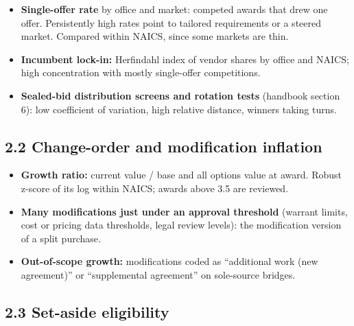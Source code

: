 \documentclass[letterpaper,11pt]{article}
\providecommand{\tightlist}{\setlength{\itemsep}{0pt}\setlength{\parskip}{0pt}}
\begin{document}
\begin{itemize}
\tightlist
\item
  \textbf{Single-offer rate} by office and market: competed awards that
  drew one offer. Persistently high rates point to tailored requirements
  or a steered market. Compared within NAICS, since some markets are
  thin.
\item
  \textbf{Incumbent lock-in:} Herfindahl index of vendor shares by
  office and NAICS; high concentration with mostly single-offer
  competitions.
\item
  \textbf{Sealed-bid distribution screens and rotation tests} (handbook
  section 6): low coefficient of variation, high relative distance,
  winners taking turns.
\end{itemize}

\hypertarget{change-order-and-modification-inflation}{%
\subsection*{2.2 Change-order and modification
inflation}\label{change-order-and-modification-inflation}}

\begin{itemize}
\tightlist
\item
  \textbf{Growth ratio:} current value / base and all options value at
  award. Robust z-score of its log within NAICS; awards above 3.5 are
  reviewed.
\item
  \textbf{Many modifications just under an approval threshold} (warrant
  limits, cost or pricing data thresholds, legal review levels): the
  modification version of a split purchase.
\item
  \textbf{Out-of-scope growth:} modifications coded as ``additional work
  (new agreement)'' or ``supplemental agreement'' on sole-source
  bridges.
\end{itemize}

\hypertarget{set-aside-eligibility}{%
\subsection*{2.3 Set-aside eligibility}\label{set-aside-eligibility}}
\end{document}
